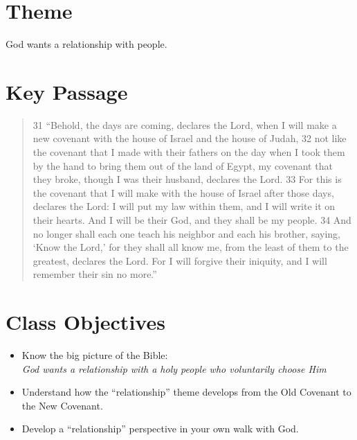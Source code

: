\newpage
\section*{Theme}

\begin{center}
\Large God wants a relationship with people.
\end{center}

\section*{Key Passage}\label{sec:KeyPassage}

\begin{quote}
31 ``Behold, the days are coming, declares the Lord, when I will make a new covenant with the house of Israel and the house of Judah, 32 not like the covenant that I made with their fathers on the day when I took them by the hand to bring them out of the land of Egypt, my covenant that they broke, though I was their husband, declares the Lord. 33 For this is the covenant that I will make with the house of Israel after those days, declares the Lord: I will put my law within them, and I will write it on their hearts. And I will be their God, and they shall be my people. 34 And no longer shall each one teach his neighbor and each his brother, saying, `Know the Lord,' for they shall all know me, from the least of them to the greatest, declares the Lord. For I will forgive their iniquity, and I will remember their sin no more.'' 
\end{quote}

\section*{Class Objectives}\label{sec:ClassObjectives}
\begin{itemize}
\item Know the big picture of the Bible:\\\emph{God wants a relationship with a holy people who voluntarily choose Him}
\item Understand how the ``relationship'' theme develops from the Old Covenant to the New Covenant.
\item Develop a ``relationship'' perspective in your own walk with God.
\end{itemize}
